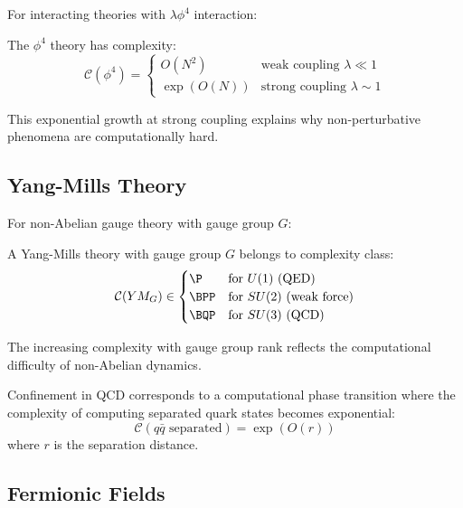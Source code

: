 \documentclass[12pt,a4paper]{article}
\newcommand{\comp}[1]{\mathcal{C}(#1)}
\begin{document}
For interacting theories with $\lambda \phi^4$ interaction:

\begin{proposition}
The $\phi^4$ theory has complexity:
\begin{equation}
\comp{\phi^4} = \begin{cases}
O(N^2) & \text{weak coupling } \lambda \ll 1 \\
\exp(O(N)) & \text{strong coupling } \lambda \sim 1
\end{cases}
\end{equation}
\end{proposition}

This exponential growth at strong coupling explains why non-perturbative phenomena are computationally hard.

\subsection{Yang-Mills Theory}

For non-Abelian gauge theory with gauge group $G$:

\begin{definition}
A Yang-Mills theory with gauge group $G$ belongs to complexity class:
\begin{equation}
\comp{YM_G} \in \begin{cases}
\P & \text{for } U(1) \text{ (QED)} \\
\BPP & \text{for } SU(2) \text{ (weak force)} \\
\BQP & \text{for } SU(3) \text{ (QCD)}
\end{cases}
\end{equation}
\end{definition}

The increasing complexity with gauge group rank reflects the computational difficulty of non-Abelian dynamics.

\begin{theorem}
Confinement in QCD corresponds to a computational phase transition where the complexity of computing separated quark states becomes exponential:
\begin{equation}
\comp{q\bar{q} \text{ separated}} = \exp(O(r))
\end{equation}
where $r$ is the separation distance.
\end{theorem}

\subsection{Fermionic Fields}
\end{document}
